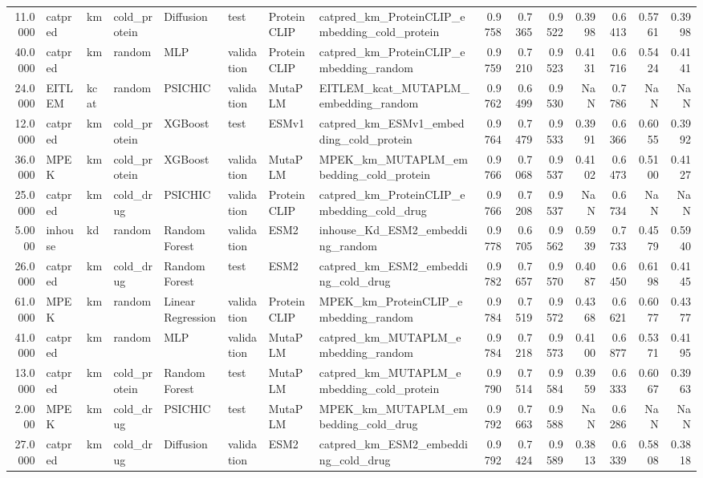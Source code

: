 \begin{tabular}{rlllllllrrrrrrr}
11.0000 & catpred & km & cold_protein & Diffusion & test & ProteinCLIP & catpred_km_ProteinCLIP_embedding_cold_protein & 0.9758 & 0.7365 & 0.9522 & 0.3998 & 0.6413 & 0.5761 & 0.3998 \\
40.0000 & catpred & km & random & MLP & validation & ProteinCLIP & catpred_km_ProteinCLIP_embedding_random & 0.9759 & 0.7210 & 0.9523 & 0.4131 & 0.6716 & 0.5424 & 0.4141 \\
24.0000 & EITLEM & kcat & random & PSICHIC & validation & MutaPLM & EITLEM_kcat_MUTAPLM_embedding_random & 0.9762 & 0.6499 & 0.9530 & NaN & 0.7786 & NaN & NaN \\
12.0000 & catpred & km & cold_protein & XGBoost & test & ESMv1 & catpred_km_ESMv1_embedding_cold_protein & 0.9764 & 0.7479 & 0.9533 & 0.3991 & 0.6366 & 0.6055 & 0.3992 \\
36.0000 & MPEK & km & cold_protein & XGBoost & validation & MutaPLM & MPEK_km_MUTAPLM_embedding_cold_protein & 0.9766 & 0.7068 & 0.9537 & 0.4102 & 0.6473 & 0.5100 & 0.4127 \\
25.0000 & catpred & km & cold_drug & PSICHIC & validation & ProteinCLIP & catpred_km_ProteinCLIP_embedding_cold_drug & 0.9766 & 0.7208 & 0.9537 & NaN & 0.6734 & NaN & NaN \\
5.0000 & inhouse & kd & random & Random Forest & validation & ESM2 & inhouse_Kd_ESM2_embedding_random & 0.9778 & 0.6705 & 0.9562 & 0.5939 & 0.7733 & 0.4579 & 0.5940 \\
26.0000 & catpred & km & cold_drug & Random Forest & test & ESM2 & catpred_km_ESM2_embedding_cold_drug & 0.9782 & 0.7657 & 0.9570 & 0.4087 & 0.6450 & 0.6198 & 0.4145 \\
61.0000 & MPEK & km & random & Linear Regression & validation & ProteinCLIP & MPEK_km_ProteinCLIP_embedding_random & 0.9784 & 0.7519 & 0.9572 & 0.4368 & 0.6621 & 0.6077 & 0.4377 \\
41.0000 & catpred & km & random & MLP & validation & MutaPLM & catpred_km_MUTAPLM_embedding_random & 0.9784 & 0.7218 & 0.9573 & 0.4100 & 0.6877 & 0.5371 & 0.4195 \\
13.0000 & catpred & km & cold_protein & Random Forest & test & MutaPLM & catpred_km_MUTAPLM_embedding_cold_protein & 0.9790 & 0.7514 & 0.9584 & 0.3959 & 0.6333 & 0.6067 & 0.3963 \\
2.0000 & MPEK & km & cold_drug & PSICHIC & test & MutaPLM & MPEK_km_MUTAPLM_embedding_cold_drug & 0.9792 & 0.7663 & 0.9588 & NaN & 0.6286 & NaN & NaN \\
27.0000 & catpred & km & cold_drug & Diffusion & validation & ESM2 & catpred_km_ESM2_embedding_cold_drug & 0.9792 & 0.7424 & 0.9589 & 0.3813 & 0.6339 & 0.5808 & 0.3818 \\

\end{tabular}

